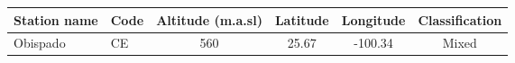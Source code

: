 \begin{table}[H]
    \begin{tabular}{llcccc} \hline
        Station name   & Code & Altitude (m.a.sl) & Latitude & Longitude & Classification \\ \hline
        Obispado       & CE   & 560               & 25.67    & -100.34   & Mixed          \\

\end{tabular}
\end{table}
